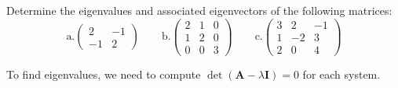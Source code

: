 \documentclass[12pt, answers]{exam}
\newcommand{\ve}[1]{\ensuremath{\mathbf{#1}}}
\begin{document}
\begin{questions}
\begin{solution}


\end{solution}


\vspace*{3em}
\addpoints
\question[10] Determine the eigenvalues and associated eigenvectors of the following matrices:
%
\begin{equation}
\text{a.} \begin{pmatrix}
   2  & -1 \\
   -1 &  2  
\end{pmatrix} \qquad
%
\text{b.} \begin{pmatrix}
  2 &  1 & 0 \\
  1 &  2 & 0 \\
  0 &  0 & 3
\end{pmatrix} \qquad 
\text{c.} \begin{pmatrix}
  3  &  2 & -1 \\
  1  & -2 &  3 \\
  2  &  0 &  4
\end{pmatrix} \nonumber
\end{equation}

\begin{solution}
To find eigenvalues, we need to compute $\det(\ve{A} - \lambda \ve{I})=0$ for each system.




\end{solution}
\end{questions}
\end{document}
